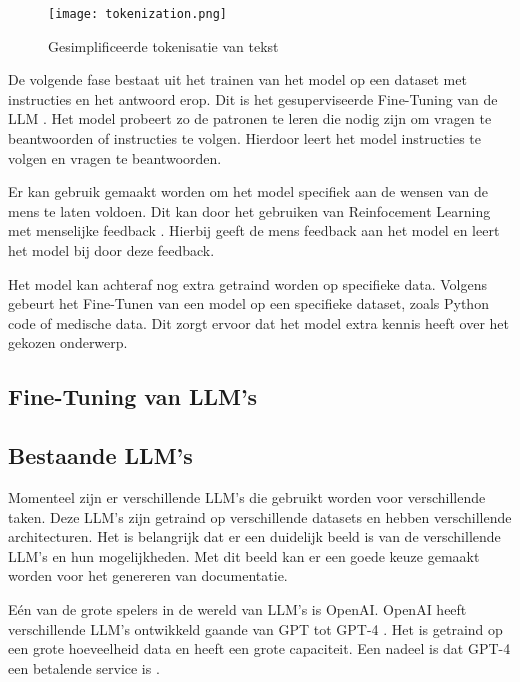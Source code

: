 \begin{figure}[h]
  \centering
  \texttt{[image: tokenization.png]}
  \caption[Tokenisatie van tekst]{Gesimplificeerde tokenisatie van tekst \autocite{TeeTracker2023}}
  \label{fig:tokenization}
\end{figure}

De volgende fase bestaat uit het trainen van het model op een dataset met instructies en het antwoord erop. 
Dit is het gesuperviseerde Fine-Tuning van de LLM \autocite{Das2024}.
Het model probeert zo de patronen te leren die nodig zijn om vragen te beantwoorden of instructies te volgen.
Hierdoor leert het model instructies te volgen en vragen te beantwoorden.

Er kan gebruik gemaakt worden om het model specifiek aan de wensen van de mens te laten voldoen. Dit kan door het gebruiken van Reinfocement Learning met menselijke feedback \autocite{LambertEtAL2022}. 
Hierbij geeft de mens feedback aan het model en leert het model bij door deze feedback.

Het model kan achteraf nog extra getraind worden op specifieke data. 
Volgens \textcite{Peckham2024} gebeurt het Fine-Tunen van een model op een specifieke dataset, zoals Python code of medische data.
Dit zorgt ervoor dat het model extra kennis heeft over het gekozen onderwerp.

\subsection{Fine-Tuning van LLM's}
\label{sec:fine-tuning-van-llms}

\subsection{Bestaande LLM's}
\label{sec:bestaande-llms}

Momenteel zijn er verschillende LLM's die gebruikt worden voor verschillende taken.
Deze LLM's zijn getraind op verschillende datasets en hebben verschillende architecturen.
Het is belangrijk dat er een duidelijk beeld is van de verschillende LLM's en hun mogelijkheden. 
Met dit beeld kan er een goede keuze gemaakt worden voor het genereren van documentatie.

Eén van de grote spelers in de wereld van LLM's is OpenAI. OpenAI heeft verschillende LLM's ontwikkeld gaande van GPT \autocite{RandfordEtAL2018} tot GPT-4 \autocite{OpenAI2023}.
Het is getraind op een grote hoeveelheid data en heeft een grote capaciteit.
Een nadeel is dat GPT-4 een betalende service is \autocite{OpenAI2023}.

